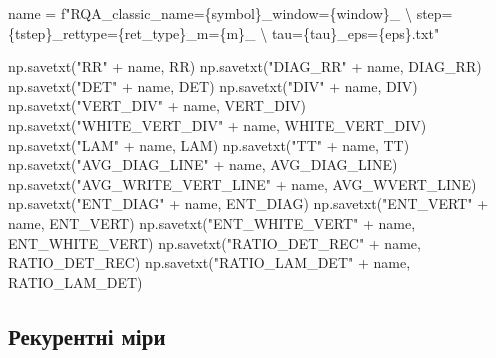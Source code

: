\documentclass[
  letterpaper,
]{report}
\newenvironment{Shaded}{\begin{snugshade}}{\end{snugshade}}
\newcommand{\CharTok}[1]{\textcolor[rgb]{0.13,0.47,0.30}{#1}}
\newcommand{\NormalTok}[1]{\textcolor[rgb]{0.00,0.23,0.31}{#1}}
\newcommand{\OperatorTok}[1]{\textcolor[rgb]{0.37,0.37,0.37}{#1}}
\newcommand{\SpecialCharTok}[1]{\textcolor[rgb]{0.37,0.37,0.37}{#1}}
\newcommand{\SpecialStringTok}[1]{\textcolor[rgb]{0.13,0.47,0.30}{#1}}
\newcommand{\StringTok}[1]{\textcolor[rgb]{0.13,0.47,0.30}{#1}}
\begin{document}
\begin{Shaded}
\begin{Highlighting}[]
\NormalTok{name }\OperatorTok{=} \SpecialStringTok{f"RQA\_classic\_name=}\SpecialCharTok{\{}\NormalTok{symbol}\SpecialCharTok{\}}\SpecialStringTok{\_window=}\SpecialCharTok{\{}\NormalTok{window}\SpecialCharTok{\}}\SpecialStringTok{\_ }\CharTok{\textbackslash{}}
\SpecialStringTok{    step=}\SpecialCharTok{\{}\NormalTok{tstep}\SpecialCharTok{\}}\SpecialStringTok{\_rettype=}\SpecialCharTok{\{}\NormalTok{ret\_type}\SpecialCharTok{\}}\SpecialStringTok{\_m=}\SpecialCharTok{\{}\NormalTok{m}\SpecialCharTok{\}}\SpecialStringTok{\_ }\CharTok{\textbackslash{}}
\SpecialStringTok{    tau=}\SpecialCharTok{\{}\NormalTok{tau}\SpecialCharTok{\}}\SpecialStringTok{\_eps=}\SpecialCharTok{\{}\NormalTok{eps}\SpecialCharTok{\}}\SpecialStringTok{.txt"}

\NormalTok{np.savetxt(}\StringTok{"RR"} \OperatorTok{+}\NormalTok{ name, RR)}
\NormalTok{np.savetxt(}\StringTok{"DIAG\_RR"} \OperatorTok{+}\NormalTok{ name, DIAG\_RR)}
\NormalTok{np.savetxt(}\StringTok{"DET"} \OperatorTok{+}\NormalTok{ name, DET)}
\NormalTok{np.savetxt(}\StringTok{"DIV"} \OperatorTok{+}\NormalTok{ name, DIV)}
\NormalTok{np.savetxt(}\StringTok{"VERT\_DIV"} \OperatorTok{+}\NormalTok{ name, VERT\_DIV)}
\NormalTok{np.savetxt(}\StringTok{"WHITE\_VERT\_DIV"} \OperatorTok{+}\NormalTok{ name, WHITE\_VERT\_DIV)}
\NormalTok{np.savetxt(}\StringTok{"LAM"} \OperatorTok{+}\NormalTok{ name, LAM)}
\NormalTok{np.savetxt(}\StringTok{"TT"} \OperatorTok{+}\NormalTok{ name, TT)}
\NormalTok{np.savetxt(}\StringTok{"AVG\_DIAG\_LINE"} \OperatorTok{+}\NormalTok{ name, AVG\_DIAG\_LINE)}
\NormalTok{np.savetxt(}\StringTok{"AVG\_WRITE\_VERT\_LINE"} \OperatorTok{+}\NormalTok{ name, AVG\_WVERT\_LINE)}
\NormalTok{np.savetxt(}\StringTok{"ENT\_DIAG"} \OperatorTok{+}\NormalTok{ name, ENT\_DIAG)}
\NormalTok{np.savetxt(}\StringTok{"ENT\_VERT"} \OperatorTok{+}\NormalTok{ name, ENT\_VERT)}
\NormalTok{np.savetxt(}\StringTok{"ENT\_WHITE\_VERT"} \OperatorTok{+}\NormalTok{ name, ENT\_WHITE\_VERT)}
\NormalTok{np.savetxt(}\StringTok{"RATIO\_DET\_REC"} \OperatorTok{+}\NormalTok{ name, RATIO\_DET\_REC)}
\NormalTok{np.savetxt(}\StringTok{"RATIO\_LAM\_DET"} \OperatorTok{+}\NormalTok{ name, RATIO\_LAM\_DET)}
\end{Highlighting}
\end{Shaded}

\hypertarget{ux440ux435ux43aux443ux440ux435ux43dux442ux43dux456-ux43cux456ux440ux438}{%
\subsection{Рекурентні
міри}\label{ux440ux435ux43aux443ux440ux435ux43dux442ux43dux456-ux43cux456ux440ux438}}
\end{document}
